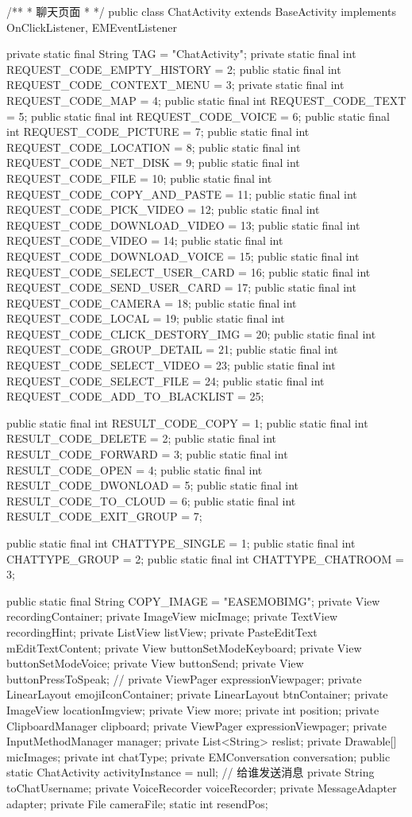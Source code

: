 /**
 * 聊天页面
 * 
 */
public class ChatActivity extends BaseActivity implements OnClickListener, EMEventListener{
	private static final String TAG = "ChatActivity";
	private static final int REQUEST_CODE_EMPTY_HISTORY = 2;
	public static final int REQUEST_CODE_CONTEXT_MENU = 3;
	private static final int REQUEST_CODE_MAP = 4;
	public static final int REQUEST_CODE_TEXT = 5;
	public static final int REQUEST_CODE_VOICE = 6;
	public static final int REQUEST_CODE_PICTURE = 7;
	public static final int REQUEST_CODE_LOCATION = 8;
	public static final int REQUEST_CODE_NET_DISK = 9;
	public static final int REQUEST_CODE_FILE = 10;
	public static final int REQUEST_CODE_COPY_AND_PASTE = 11;
	public static final int REQUEST_CODE_PICK_VIDEO = 12;
	public static final int REQUEST_CODE_DOWNLOAD_VIDEO = 13;
	public static final int REQUEST_CODE_VIDEO = 14;
	public static final int REQUEST_CODE_DOWNLOAD_VOICE = 15;
	public static final int REQUEST_CODE_SELECT_USER_CARD = 16;
	public static final int REQUEST_CODE_SEND_USER_CARD = 17;
	public static final int REQUEST_CODE_CAMERA = 18;
	public static final int REQUEST_CODE_LOCAL = 19;
	public static final int REQUEST_CODE_CLICK_DESTORY_IMG = 20;
	public static final int REQUEST_CODE_GROUP_DETAIL = 21;
	public static final int REQUEST_CODE_SELECT_VIDEO = 23;
	public static final int REQUEST_CODE_SELECT_FILE = 24;
	public static final int REQUEST_CODE_ADD_TO_BLACKLIST = 25;

	public static final int RESULT_CODE_COPY = 1;
	public static final int RESULT_CODE_DELETE = 2;
	public static final int RESULT_CODE_FORWARD = 3;
	public static final int RESULT_CODE_OPEN = 4;
	public static final int RESULT_CODE_DWONLOAD = 5;
	public static final int RESULT_CODE_TO_CLOUD = 6;
	public static final int RESULT_CODE_EXIT_GROUP = 7;

	public static final int CHATTYPE_SINGLE = 1;
	public static final int CHATTYPE_GROUP = 2;
	public static final int CHATTYPE_CHATROOM = 3;

	public static final String COPY_IMAGE = "EASEMOBIMG";
	private View recordingContainer;
	private ImageView micImage;
	private TextView recordingHint;
	private ListView listView;
	private PasteEditText mEditTextContent;
	private View buttonSetModeKeyboard;
	private View buttonSetModeVoice;
	private View buttonSend;
	private View buttonPressToSpeak;
	// private ViewPager expressionViewpager;
	private LinearLayout emojiIconContainer;
	private LinearLayout btnContainer;
	private ImageView locationImgview;
	private View more;
	private int position;
	private ClipboardManager clipboard;
	private ViewPager expressionViewpager;
	private InputMethodManager manager;
	private List<String> reslist;
	private Drawable[] micImages;
	private int chatType;
	private EMConversation conversation;
	public static ChatActivity activityInstance = null;
	// 给谁发送消息
	private String toChatUsername;
	private VoiceRecorder voiceRecorder;
	private MessageAdapter adapter;
	private File cameraFile;
	static int resendPos;

}
